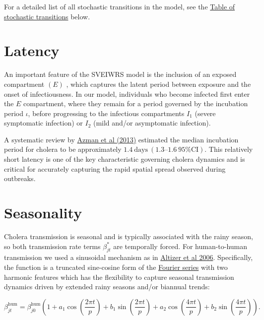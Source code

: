 \documentclass[
]{book}
\begin{document}
For a detailed list of all stochastic transitions in the model, see the \hyperref[transitions-table]{Table of stochastic transitions} below.

\section{Latency}\label{latency}

An important feature of the SVEIWRS model is the inclusion of an exposed compartment \(\left(E\right)\) , which captures the latent period between exposure and the onset of infectiousness. In our model, individuals who become infected first enter the \(E\) compartment, where they remain for a period governed by the incubation period \(\iota\), before progressing to the infectious compartments \(I_1\) (severe symptomatic infection) or \(I_2\) (mild and/or asymptomatic infection).

A systematic review by \href{http://www.sciencedirect.com/science/article/pii/S0163445312003477}{Azman et al (2013)} estimated the median incubation period for cholera to be approximately \(1.4 \ \text{days} \ (1.3–1.6 \ 95\% \text{CI})\). This relatively short latency is one of the key characteristic governing cholera dynamics and is critical for accurately capturing the rapid spatial spread observed during outbreaks.

\section{Seasonality}\label{seasonality}

Cholera transmission is seasonal and is typically associated with the rainy season, so both transmission rate terms \(\beta_{jt}^{\text{*}}\) are temporally forced. For human-to-human transmission we used a sinusoidal mechanism as in \href{https://onlinelibrary.wiley.com/doi/epdf/10.1111/j.1461-0248.2005.00879.x}{Altizer et al 2006}. Specifically, the function is a truncated sine-cosine form of the \href{https://en.wikipedia.org/wiki/Fourier_series}{Fourier series} with two harmonic features which has the flexibility to capture seasonal transmission dynamics driven by extended rainy seasons and/or biannual trends:

\begin{equation}
\beta_{jt}^{\text{hum}} = \beta_{j0}^{\text{hum}} \left(1 + a_1 \cos\left(\frac{2\pi t}{p}\right) + b_1 \sin\left(\frac{2\pi t}{p}\right) + a_2 \cos\left(\frac{4\pi t}{p}\right) + b_2 \sin\left(\frac{4\pi t}{p}\right)\right).
\label{eq:beta1}
\end{equation}
\end{document}
